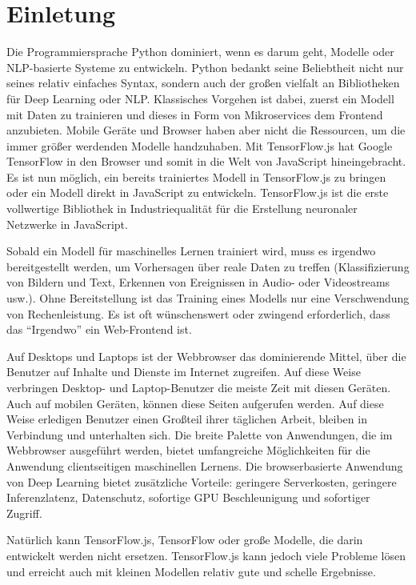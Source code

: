\chapter{Einletung}
Die Programmiersprache Python dominiert, wenn es darum geht, Modelle oder NLP-basierte Systeme zu entwickeln. Python bedankt seine Beliebtheit nicht nur seines relativ einfaches Syntax, sondern auch der großen vielfalt an Bibliotheken für Deep Learning oder NLP. Klassisches Vorgehen ist dabei, zuerst ein Modell mit Daten zu trainieren und dieses in Form von Mikroservices dem Frontend anzubieten. Mobile Geräte und Browser haben aber nicht die Ressourcen, um die immer größer werdenden Modelle handzuhaben. Mit TensorFlow.js hat Google TensorFlow in den Browser und somit in die Welt von JavaScript hineingebracht. Es ist nun möglich, ein bereits trainiertes Modell in TensorFlow.js zu bringen oder ein Modell direkt in JavaScript zu entwickeln. TensorFlow.js ist die erste vollwertige Bibliothek in Industriequalität für die Erstellung neuronaler Netzwerke in JavaScript. 

Sobald ein Modell für maschinelles Lernen trainiert wird, muss es irgendwo bereitgestellt werden, um Vorhersagen über reale Daten zu treffen (\zb Klassifizierung von Bildern und Text, Erkennen von Ereignissen in Audio- oder Videostreams usw.). Ohne Bereitstellung ist das Training eines Modells nur eine Verschwendung von Rechenleistung. Es ist oft wünschenswert oder zwingend erforderlich, dass das \enquote{Irgendwo} ein Web-Frontend ist.

Auf Desktops und Laptops ist der Webbrowser das dominierende Mittel, über die Benutzer auf Inhalte und Dienste im Internet zugreifen. Auf diese Weise verbringen Desktop- und Laptop-Benutzer die meiste Zeit mit diesen Geräten. Auch auf mobilen Geräten, können diese Seiten aufgerufen werden. Auf diese Weise erledigen Benutzer einen Großteil ihrer täglichen Arbeit, bleiben in Verbindung und unterhalten sich. Die breite Palette von Anwendungen, die im Webbrowser ausgeführt werden, bietet umfangreiche Möglichkeiten für die Anwendung clientseitigen maschinellen Lernens. Die browserbasierte Anwendung von Deep Learning bietet zusätzliche Vorteile: geringere Serverkosten, geringere Inferenzlatenz, Datenschutz, sofortige GPU Beschleunigung und sofortiger Zugriff.

Natürlich kann TensorFlow.js, TensorFlow oder große Modelle, die darin entwickelt werden nicht ersetzen. TensorFlow.js kann jedoch viele Probleme lösen und erreicht auch mit kleinen Modellen relativ gute und schelle Ergebnisse.


